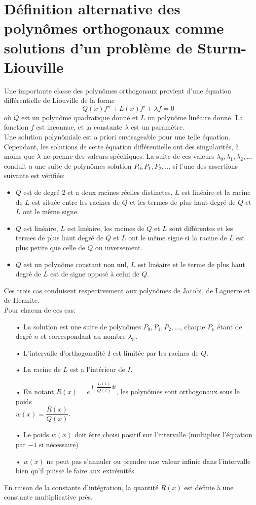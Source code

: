 \chapter{Définition alternative des polynômes orthogonaux comme solutions d'un problème de Sturm-Liouville}
Une importante classe des polynômes orthogonaux provient d'une équation différentielle de Liouville de la forme
$$Q(x)f''+L(x)f'+\lambda f=0$$ où $Q$ est un polynôme quadratique donné et $L$ un polynôme linéaire donné. La fonction $f$ est inconnue, et la constante $\lambda$ est un paramètre.
\\Une solution polynômiale est a priori envisageable pour une telle équation. Cependant, les solutions de cette équation différentielle ont des singularités, à moins que $\lambda$ ne prenne des valeurs spécifiques. La suite de ces valeurs $\lambda_0,\lambda_1,\lambda_2,\dots$ conduit a une suite de polynômes solution $P_0,P_1,P_2,\dots$ si l'une des assertions suivante est vérifiée:
\begin{itemize}
\item $Q$ est de degré 2 et a deux racines réelles distinctes, $L$ est linéaire et la racine de $L$ est située entre les racines de $Q$ et les termes de plus haut degré de $Q$ et $L$ ont le même signe.
\item $Q$ est linéaire, $L$ est linéaire, les racines de $Q$ et $L$ sont différentes et les termes de plus haut degré de $Q$ et $L$ ont le même signe si la racine de $L$ est plus petite que celle de $Q$ ou inversement.
\item $Q$ est un polynôme constant non nul, $L$ est linéaire et le terme de plus haut degré de $L$ est de signe opposé à celui de $Q$. 
\end{itemize}
Ces trois cas conduisent respectivement aux polynômes de Jacobi, de Laguerre et de Hermite.
\\$ $\\Pour chacun de ces cas:
\begin{itemize}
\item[•] La solution est une suite de polynômes $P_0,P_1,P_2,\dots$, chaque $P_n$ étant de degré $n$ et correspondant au nombre $\lambda_n$.
\item[•] L'intervalle d'orthogonalité $I$ est limitée par les racines de $Q$.
\item[•] La racine de $L$ est a l'intérieur de $I$.
\item[•] En notant $R(x)=e^{\int_I {\dfrac{L(t)}{Q(t)}dt}}$, les polynômes sont orthogonaux sous le poids \\$w(x)=\dfrac{R(x)}{Q(x)}$.
\item[•] Le poids $w(x)$ doit être choisi positif sur l'intervalle (multiplier l'équation par $-1$ si nécessaire)
\item[•] $w(x)$ ne peut pas s'annuler ou prendre une valeur infinie dans l'intervalle bien qu'il puisse le faire aux extrémités.
\end{itemize} 
$ $\\En raison de la constante d'intégration, la quantité $R(x)$ est définie à une constante multiplicative près.